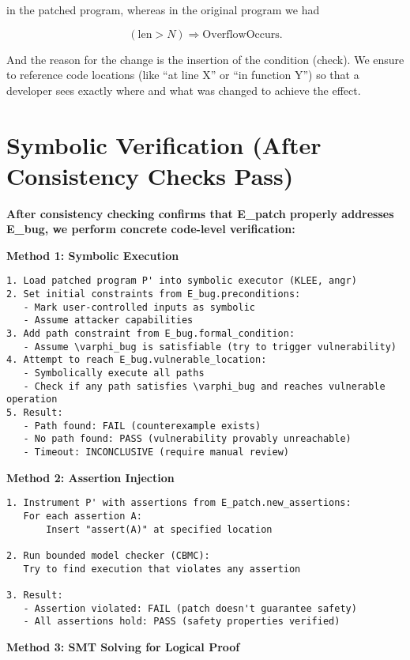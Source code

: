 \documentclass[conference,compsoc]{IEEEtran}
\begin{document}
in the patched program, whereas in the original program we had

\[
(\text{len} > N) \Rightarrow \text{OverflowOccurs}.
\]

And the reason for the change is the insertion of the condition (check).
We ensure to reference code locations (like ``at line X'' or ``in
function Y'') so that a developer sees exactly where and what was
changed to achieve the effect.

\section{Symbolic Verification (After Consistency Checks
Pass)}\label{symbolic-verification-after-consistency-checks-pass}

\textbf{After consistency checking confirms that E\_patch properly
addresses E\_bug, we perform concrete code-level verification:}

\textbf{Method 1: Symbolic Execution}

\begin{verbatim}
1. Load patched program P' into symbolic executor (KLEE, angr)
2. Set initial constraints from E_bug.preconditions:
   - Mark user-controlled inputs as symbolic
   - Assume attacker capabilities
3. Add path constraint from E_bug.formal_condition:
   - Assume \varphi_bug is satisfiable (try to trigger vulnerability)
4. Attempt to reach E_bug.vulnerable_location:
   - Symbolically execute all paths
   - Check if any path satisfies \varphi_bug and reaches vulnerable operation
5. Result:
   - Path found: FAIL (counterexample exists)
   - No path found: PASS (vulnerability provably unreachable)
   - Timeout: INCONCLUSIVE (require manual review)
\end{verbatim}

\textbf{Method 2: Assertion Injection}

\begin{verbatim}
1. Instrument P' with assertions from E_patch.new_assertions:
   For each assertion A:
       Insert "assert(A)" at specified location
       
2. Run bounded model checker (CBMC):
   Try to find execution that violates any assertion
   
3. Result:
   - Assertion violated: FAIL (patch doesn't guarantee safety)
   - All assertions hold: PASS (safety properties verified)
\end{verbatim}

\textbf{Method 3: SMT Solving for Logical Proof}
\end{document}
